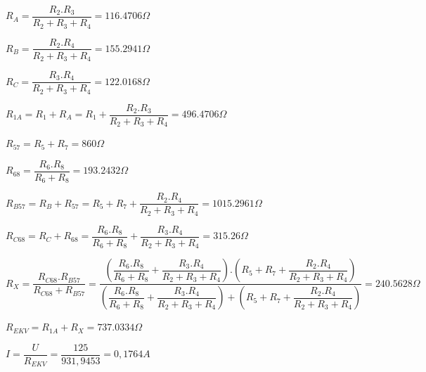 \documentclass[10pt,a4paper]{article}
\begin{document}
    
$R_{A}=\dfrac{R_{2}.R_{3}}{R_{2}+R_{3}+R_{4}} = 116.4706\Omega$ \vspace*{0.5cm}

$R_{B}=\dfrac{R_{2}.R_{4}}{R_{2}+R_{3}+R_{4}} = 155.2941\Omega$ \vspace*{0.5cm}

$R_{C}=\dfrac{R_{3}.R_{4}}{R_{2}+R_{3}+R_{4}} = 122.0168\Omega$ \vspace*{0.5cm}

\newpage
$R_{1A}=R_{1}+R_{A}=R_{1} + \dfrac{R_{2}.R_{3}}{R_{2}+R_{3}+R_{4}} = 496.4706\Omega$\\

\vspace*{0.5cm}

$R_{57}=R_{5}+R_{7}=860\Omega$ 

\vspace*{0.5cm}
	
$R_{68}=\dfrac{R_{6}.R_{8}}{R_{6}+R_{8}}=193.2432\Omega$

\vspace*{0.5cm}

$R_{B57}=R_{B}+R_{57}=R_{5}+R_{7}+\dfrac{R_{2}.R_{4}}{R_{2}+R_{3}+R_{4}} = 1015.2961\Omega$

\hspace*{0.5cm}

\vspace*{0.5cm}

$R_{C68}=R_{C}+R_{68}=\dfrac{R_{6}.R_{8}}{R_{6}+R_{8}} + \dfrac{R_{3}.R_{4}}{R_{2}+R_{3}+R_{4}} = 315.26\Omega$    

\hspace*{0.5cm}

\vspace*{0.5cm}

$R_{X}=\dfrac{R_{C68}.R_{B57}}{R_{C68}+R_{B57}}=
\dfrac
{
(\dfrac{R_{6}.R_{8}}{R_{6}+R_{8}} + \dfrac{R_{3}.R_{4}}{R_{2}+R_{3}+R_{4}})
.(R_{5}+R_{7} + \dfrac{R_{2}.R_{4}}{R_{2}+R_{3}+R_{4}})
}
{
(\dfrac{R_{6}.R_{8}}{R_{6}+R_{8}} + \dfrac{R_{3}.R_{4}}{R_{2}+R_{3}+R_{4}})
+(R_{5}+R_{7} + \dfrac{R_{2}.R_{4}}{R_{2}+R_{3}+R_{4}})
} = 240.5628\Omega$

\hspace*{0.5cm}

\vspace*{0.5cm}

$ {R_{EKV}} = R_{1A}+R_{X}=737.0334\Omega$

\vspace*{0.5cm}

$I=\dfrac{U}{R_{EKV}}=\dfrac{125}{931,9453}=0,1764A$
\end{document}
